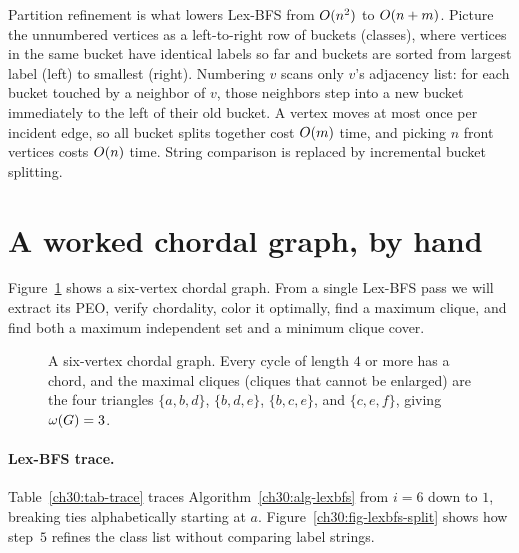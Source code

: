 \begin{whybox}
Partition refinement is what lowers Lex-BFS from $O(n^2)$ to $O(n+m)$. Picture the unnumbered vertices as a left-to-right row of buckets (classes), where vertices in the same bucket have identical labels so far and buckets are sorted from largest label (left) to smallest (right). Numbering $v$ scans only $v$'s adjacency list: for each bucket touched by a neighbor of $v$, those neighbors step into a new bucket immediately to the left of their old bucket. A vertex moves at most once per incident edge, so all bucket splits together cost $O(m)$ time, and picking $n$ front vertices costs $O(n)$ time. String comparison is replaced by incremental bucket splitting.
\end{whybox}

\section{A worked chordal graph, by hand}

Figure~\ref{ch30:fig-tracegraph} shows a six-vertex chordal graph. From a single Lex-BFS pass we will extract its PEO, verify chordality, color it optimally, find a maximum clique, and find both a maximum independent set and a minimum clique cover.

\begin{figure}[htbp]
\centering
{}
\caption{A six-vertex chordal graph. Every cycle of length $4$ or more has a chord, and the maximal cliques (cliques that cannot be enlarged) are the four triangles $\{a,b,d\}$, $\{b,d,e\}$, $\{b,c,e\}$, and $\{c,e,f\}$, giving $\omega(G)=3$.}
\label{ch30:fig-tracegraph}
\end{figure}

\paragraph{Lex-BFS trace.}
Table~\ref{ch30:tab-trace} traces Algorithm~\ref{ch30:alg-lexbfs} from $i=6$ down to $1$, breaking ties alphabetically starting at $a$. Figure~\ref{ch30:fig-lexbfs-split} shows how step~$5$ refines the class list without comparing label strings.

